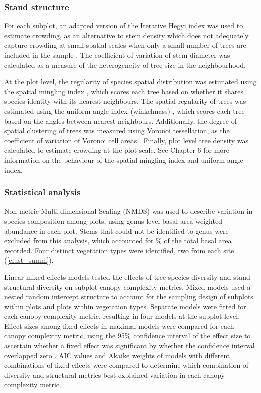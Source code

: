 \documentclass[11pt,a4paper]{article}
\begin{document}
\subsubsection{Stand structure}

For each subplot, an adapted version of the Iterative Hegyi index was used to estimate crowding, as an alternative to stem density which does not adequately capture crowding at small spatial scales when only a small number of trees are included in the sample \citep{Hegyi1974}. The coefficient of variation of stem diameter was calculated as a measure of the heterogeneity of tree size in the neighbourhood. 

At the plot level, the regularity of species spatial distribution was estimated using the spatial mingling index \citep{Gadow2002}, which scores each tree based on whether it shares species identity with its nearest neighbours. The spatial regularity of trees was estimated using the uniform angle index (winkelmass) \citep{Gadow2002}, which scores each tree based on the angles between nearest neighbours. Additionally, the degree of spatial clustering of trees was measured using Voronoi tessellation, as the coefficient of variation of Voronoi cell areas \citep{Ong2012}. Finally, plot level tree density was calculated to estimate crowding at the plot scale. See Chapter 6 for more information on the behaviour of the spatial mingling index and uniform angle index.

\subsubsection{Statistical analysis}

Non-metric Multi-dimensional Scaling (NMDS) was used to describe variation in species composition among plots, using genus-level basal area weighted abundance in each plot. Stems that could not be identified to genus were excluded from this analysis, which accounted for \perIndet{}\% of the total basal area recorded. Four distinct vegetation types were identified, two from each site (\autoref{clust_summ}). 

Linear mixed effects models tested the effects of tree species diversity and stand structural diversity on subplot canopy complexity metrics. Mixed models used a nested random intercept structure to account for the sampling design of subplots within plots and plots within vegetation types. Separate models were fitted for each canopy complexity metric, resulting in four models at the subplot level. Effect sizes among fixed effects in maximal models were compared for each canopy complexity metric, using the 95\% confidence interval of the effect size to ascertain whether a fixed effect was significant by whether the confidence interval overlapped zero \citep{Nakagawa2007}. AIC values and Akaike weights of models with different combinations of fixed effects were compared to determine which combination of diversity and structural metrics best explained variation in each canopy complexity metric. 
\end{document}
